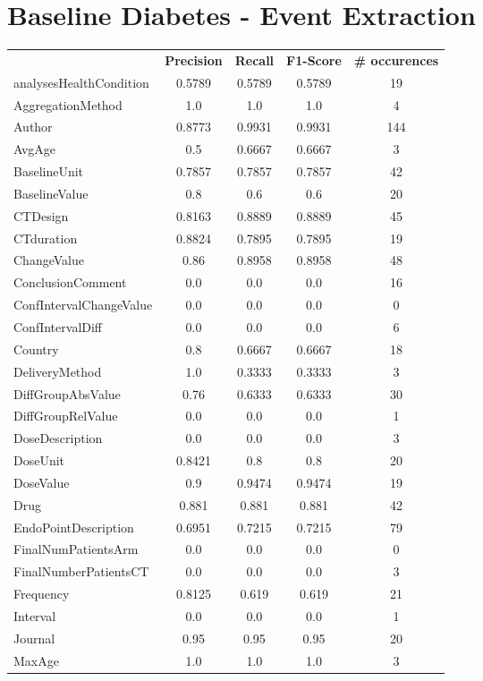 \section{Baseline Diabetes - Event Extraction}
\begin{longtable}{ l c c c c}
 & \textbf{Precision} & \textbf{Recall} & \textbf{F1-Score} & \textbf{\# occurences} \\ \cline{1-5}
analysesHealthCondition & 0.5789 & 0.5789 & 0.5789 & 19\\
AggregationMethod & 1.0 & 1.0 & 1.0 & 4\\
Author & 0.8773 & 0.9931 & 0.9931 & 144\\
AvgAge & 0.5 & 0.6667 & 0.6667 & 3\\
BaselineUnit & 0.7857 & 0.7857 & 0.7857 & 42\\
BaselineValue & 0.8 & 0.6 & 0.6 & 20\\
CTDesign & 0.8163 & 0.8889 & 0.8889 & 45\\
CTduration & 0.8824 & 0.7895 & 0.7895 & 19\\
ChangeValue & 0.86 & 0.8958 & 0.8958 & 48\\
ConclusionComment & 0.0 & 0.0 & 0.0 & 16\\
ConfIntervalChangeValue & 0.0 & 0.0 & 0.0 & 0\\
ConfIntervalDiff & 0.0 & 0.0 & 0.0 & 6\\
Country & 0.8 & 0.6667 & 0.6667 & 18\\
DeliveryMethod & 1.0 & 0.3333 & 0.3333 & 3\\
DiffGroupAbsValue & 0.76 & 0.6333 & 0.6333 & 30\\
DiffGroupRelValue & 0.0 & 0.0 & 0.0 & 1\\
DoseDescription & 0.0 & 0.0 & 0.0 & 3\\
DoseUnit & 0.8421 & 0.8 & 0.8 & 20\\
DoseValue & 0.9 & 0.9474 & 0.9474 & 19\\
Drug & 0.881 & 0.881 & 0.881 & 42\\
EndoPointDescription & 0.6951 & 0.7215 & 0.7215 & 79\\
FinalNumPatientsArm & 0.0 & 0.0 & 0.0 & 0\\
FinalNumberPatientsCT & 0.0 & 0.0 & 0.0 & 3\\
Frequency & 0.8125 & 0.619 & 0.619 & 21\\
Interval & 0.0 & 0.0 & 0.0 & 1\\
Journal & 0.95 & 0.95 & 0.95 & 20\\
MaxAge & 1.0 & 1.0 & 1.0 & 3\\

\end{longtable}

